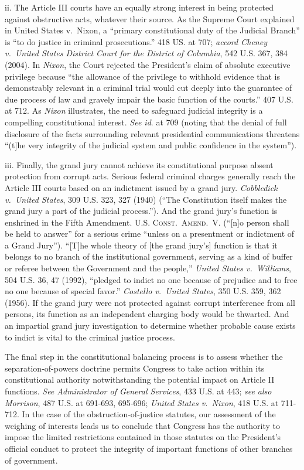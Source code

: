 ii. The Article III courts have an equally strong interest in being protected against obstructive acts, whatever their source.
As the Supreme Court explained in United States v.\ Nixon, a “primary constitutional duty of the Judicial Branch” is “to do justice in criminal prosecutions.” 418 US. at 707;
\textit{accord Cheney v.\ United States District Court for the District of Columbia}, 542 U.S. 367, 384 (2004).
In \textit{Nixon}, the Court rejected the President’s claim of absolute executive privilege because “the allowance of the privilege to withhold evidence that is demonstrably relevant in a criminal trial would cut deeply into the guarantee of due process of law and gravely impair the basic function of the courts.” 407 U.S. at 712.
As \textit{Nixon} illustrates, the need to safeguard judicial integrity is a compelling constitutional interest.
\textit{See id}. at 709 (noting that the denial of full disclosure of the facts surrounding relevant presidential communications threatens “(t]he very integrity of the judicial system and public confidence in the system”).

iii. Finally, the grand jury cannot achieve its constitutional purpose absent protection from corrupt acts.
Serious federal criminal charges generally reach the Article III courts based on an indictment issued by a grand jury.
\textit{Cobbledick v.\ United States}, 309 U.S. 323, 327 (1940) (“The Constitution itself makes the grand jury a part of the judicial process.”).
And the grand jury’s function is enshrined in the Fifth Amendment.
\textsc{U.S. Const.\ Amend.~V}. (“[n]o person shall be held to answer” for a serious crime “unless on a presentment or indictment of a Grand Jury”).
“[T]he whole theory of [the grand jury’s] function is that it belongs to no branch of the institutional government, serving as a kind of buffer or referee between the Government and the people,” \textit{United States v.\ Williams}, 504 U.S. 36, 47 (1992), “pledged to indict no one because of prejudice and to free no one because of special favor.”
\textit{Costello v.\ United States}, 350 U.S. 359, 362 (1956).
If the grand jury were not protected against corrupt interference from all persons, its function as an independent charging body would be thwarted.
And an impartial grand jury investigation to determine whether probable cause exists to indict is vital to the criminal justice process.

\hr

The final step in the constitutional balancing process is to assess whether the separation-of-powers doctrine permits Congress to take action within its constitutional authority notwithstanding the potential impact on Article II functions.
\textit{See Administrator of General Services}, 433 U.S. at 443;
\textit{see also Morrison}, 487 U.S. at 691-693, 695-696;
\textit{United States v.\ Nixon}, 418 U.S. at 711-712.
In the case of the obstruction-of-justice statutes, our assessment of the weighing of interests leads us to conclude that Congress has the authority to impose the limited restrictions contained in those statutes on the President’s official conduct to protect the integrity of important functions of other branches of government.

